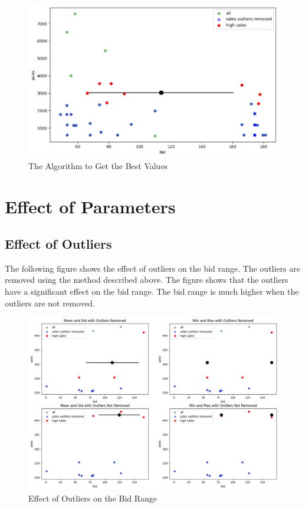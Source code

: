 \begin{figure}[ht]
    \includegraphics[width=\textwidth, height=0.6\textwidth]{images/part2/bid_range_0.png}
    \centering
    \caption{The Algorithm to Get the Best Values}
\end{figure}

\section{Effect of Parameters}

\subsection{Effect of Outliers}

The following figure shows the effect of outliers on the bid range. The outliers are removed using the method described above. The figure shows that the outliers have a significant effect on the bid range. The bid range is much higher when the outliers are not removed.

\begin{figure}[ht]
    \includegraphics[width=\textwidth, height=0.6\textwidth]{images/part2/bid_range_1.png}
    \centering
    \caption{Effect of Outliers on the Bid Range}
\end{figure}


